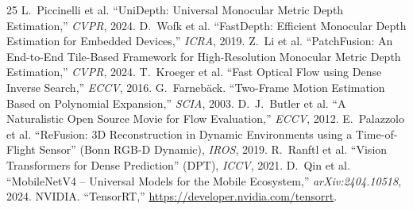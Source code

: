 \documentclass[10pt,twocolumn]{article}
\begin{document}
\begin{thebibliography}{25}
 L.~Piccinelli et al. ``UniDepth: Universal Monocular Metric Depth Estimation,'' \emph{CVPR}, 2024.
 D.~Wofk et al. ``FastDepth: Efficient Monocular Depth Estimation for Embedded Devices,'' \emph{ICRA}, 2019.
 Z.~Li et al. ``PatchFusion: An End-to-End Tile-Based Framework for High-Resolution Monocular Metric Depth Estimation,'' \emph{CVPR}, 2024.
 T.~Kroeger et al. ``Fast Optical Flow using Dense Inverse Search,'' \emph{ECCV}, 2016.
 G.~Farneb\"ack. ``Two-Frame Motion Estimation Based on Polynomial Expansion,'' \emph{SCIA}, 2003.
 D.~J.~Butler et al. ``A Naturalistic Open Source Movie for Flow Evaluation,'' \emph{ECCV}, 2012.
 E.~Palazzolo et al. ``ReFusion: 3D Reconstruction in Dynamic Environments using a Time-of-Flight Sensor'' (Bonn RGB-D Dynamic), \emph{IROS}, 2019.
 R.~Ranftl et al. ``Vision Transformers for Dense Prediction'' (DPT), \emph{ICCV}, 2021.
 D.~Qin et al. ``MobileNetV4 -- Universal Models for the Mobile Ecosystem,'' \emph{arXiv:2404.10518}, 2024.
 NVIDIA. ``TensorRT,'' \url{https://developer.nvidia.com/tensorrt}.
\end{thebibliography}
\end{document}

